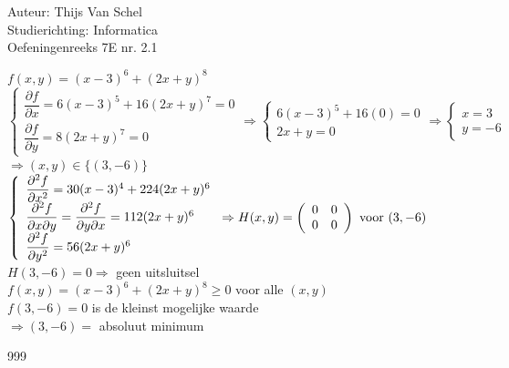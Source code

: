 \documentclass[a4paper]{article}
\begin{document}
  
\noindent \large Auteur: Thijs Van Schel \\
\noindent \large Studierichting: Informatica\\
\noindent \large Oefeningenreeks 7E nr. 2.1\\

\medskip

\normalsize

$f(x,y) = (x-3)^6 + (2x+y)^8$ \\

$
\left\{ 
\begin{array}{l} 
\dfrac{\partial f}{\partial x} = 6(x-3)^5 + 16(2x+y)^7 = 0 \\ 
\dfrac{\partial f}{\partial y} = 8(2x+y)^7 = 0 
\end{array} 
\right.
\Rightarrow
\left\{ 
\begin{array}{l} 
6(x-3)^5 + 16(0) = 0 \\ 
2x+y = 0 
\end{array} 
\right.
\Rightarrow
\left\{ 
\begin{array}{l} 
x = 3 \\ 
y = -6 
\end{array} 
\right.
$\\

$\Rightarrow (x,y) \in \{(3, -6)\}$\\

$
\left\{ 
\begin{array}{l} 
\dfrac{\partial^2 f}{\partial x^2} = 30(x-3)^4 + 224(2x+y)^6 \\ 
\dfrac{\partial^2 f}{\partial x \partial y} = \dfrac{\partial^2 f}{\partial y \partial x} = 112(2x+y)^6 \\
\dfrac{\partial^2 f}{\partial y^2} = 56(2x+y)^6
\end{array} 
\right.
\Rightarrow H(x,y) = \left(\begin{array}{c c} 0 & 0 \\ 0 & 0 \end{array}\right) \text{ voor } (3,-6)
$\\

$H(3, -6) = 0 \Rightarrow$ geen uitsluitsel\\

$f(x,y) = (x-3)^6 + (2x+y)^8 \ge 0$ voor alle $(x,y)$\\

$f(3,-6) = 0$ is de kleinst mogelijke waarde\\

$\Rightarrow (3, -6) = $ absoluut minimum\\

\begin{thebibliography}{999}
\end{thebibliography}
\end{document}
